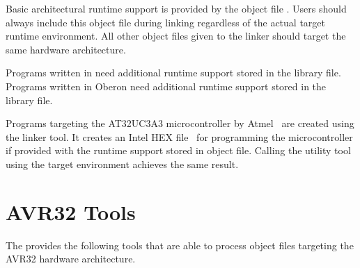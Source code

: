 Basic architectural runtime support is provided by the object file .
Users should always include this object file during linking regardless of the actual target runtime environment.
All other object files given to the linker should target the same hardware architecture.

Programs written in \cpp{} need additional runtime support stored in the  library file.
Programs written in Oberon need additional runtime support stored in the  library file.
\seecpp\seeoberon

Programs targeting the AT32UC3A3 microcontroller by Atmel~\cite{at32uc3a3} are created using the  linker tool.
It creates an Intel HEX file~\cite{hexfile} for programming the microcontroller if provided with the runtime support stored in  object file.
Calling the  utility tool using the  target environment achieves the same result.

\section{AVR32 Tools}

The \ecs{} provides the following tools that are able to process object files targeting the AVR32 hardware architecture.
\interface

\cdavrtt
\cppavrtt
\falavrtt
\obavrtt
\avrttasm
\avrttdism
\linkhex

\concludechapter
